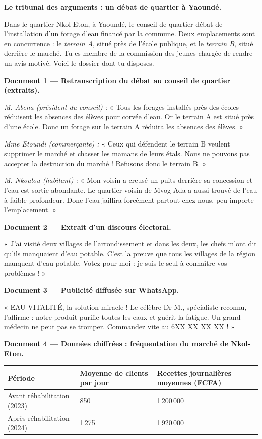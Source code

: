 \documentclass[11pt]{article}
\newcommand{\cle}[1]{{\popxbold\color{popdark}#1}}
\newcounter{popsec}
\newcounter{popsub}
\newcommand{\courssub}[1]{%
  \stepcounter{popsub}%
  \par\vspace{9pt}\noindent{\popxbold\fontsize{11.5}{13}\selectfont\color{popink}{\color{poporange}\thepopsec.\thepopsub}\hspace{6pt}#1}\par\nopagebreak\vspace{4pt}
}
\begin{document}
\courssub{Situation}

\textbf{Le tribunal des arguments : un débat de quartier à Yaoundé.}

Dans le quartier Nkol-Eton, à Yaoundé, le conseil de quartier débat de l'installation d'un \cle{forage d'eau} financé par la commune. Deux emplacements sont en concurrence : le \emph{terrain A}, situé près de l'école publique, et le \emph{terrain B}, situé derrière le marché. Tu es membre de la commission des jeunes chargée de rendre un avis motivé. Voici le dossier dont tu disposes.

\textbf{Document 1 — Retranscription du débat au conseil de quartier (extraits).}

\emph{M. Abena (président du conseil) :} « Tous les forages installés près des écoles réduisent les absences des élèves pour corvée d'eau. Or le terrain A est situé près d'une école. Donc un forage sur le terrain A réduira les absences des élèves. »

\emph{Mme Etoundi (commerçante) :} « Ceux qui défendent le terrain B veulent supprimer le marché et chasser les mamans de leurs étals. Nous ne pouvons pas accepter la destruction du marché ! Refusons donc le terrain B. »

\emph{M. Nkoulou (habitant) :} « Mon voisin a creusé un puits derrière sa concession et l'eau est sortie abondante. Le quartier voisin de Mvog-Ada a aussi trouvé de l'eau à faible profondeur. Donc l'eau jaillira forcément partout chez nous, peu importe l'emplacement. »

\textbf{Document 2 — Extrait d'un discours électoral.}

« J'ai visité deux villages de l'arrondissement et dans les deux, les chefs m'ont dit qu'ils manquaient d'eau potable. C'est la preuve que tous les villages de la région manquent d'eau potable. Votez pour moi : je suis le seul à connaître vos problèmes ! »

\textbf{Document 3 — Publicité diffusée sur WhatsApp.}

« EAU-VITALITÉ, la solution miracle ! Le célèbre Dr M., spécialiste reconnu, l'affirme : notre produit purifie toutes les eaux et guérit la fatigue. Un grand médecin ne peut pas se tromper. Commandez vite au 6XX XX XX XX ! »

\textbf{Document 4 — Données chiffrées : fréquentation du marché de Nkol-Eton.}

\begin{center}
\begin{tabularx}{\linewidth}{|l|X|X|}\hline
\rowcolor{popblueL} \textbf{Période} & \textbf{Moyenne de clients par jour} & \textbf{Recettes journalières moyennes (FCFA)} \\ \hline
Avant réhabilitation (2023) & 850 & 1\,200\,000 \\ \hline
Après réhabilitation (2024) & 1\,275 & 1\,920\,000 \\ \hline
\end{tabularx}
\end{center}
\end{document}
